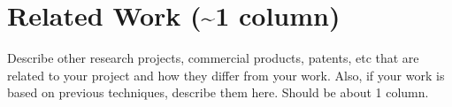 \section{Related Work (\textasciitilde 1 column)}
\label{sec:related}

Describe other research projects, commercial products, patents, etc that are
related to your project and how they differ from your work. Also, if your
work is based on previous techniques, describe them here. Should be about 1
column.
